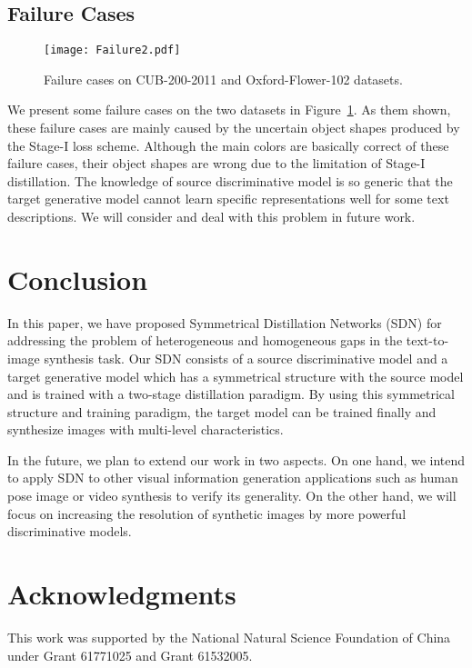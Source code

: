 \documentclass[sigconf]{acmart}
\begin{document}
\subsection{Failure Cases}

\begin{figure}[t]
	\begin{center}
		\texttt{[image: Failure2.pdf]}
	\end{center}
	\caption{Failure cases on CUB-200-2011 and Oxford-Flower-102 datasets.}
	\label{fig:failure}
\end{figure}

We present some failure cases on the two datasets in Figure~\ref{fig:failure}. As them shown, these failure cases are mainly caused by the uncertain object shapes produced by the Stage-I loss scheme. Although the main colors are basically correct of these failure cases, their object shapes are wrong due to the limitation of Stage-I distillation. The knowledge of source discriminative model is so generic that the target generative model cannot learn specific representations well for some text descriptions. We will consider and deal with this problem in future work.


\section{Conclusion}
In this paper, we have proposed Symmetrical Distillation Networks (SDN) for addressing the problem of heterogeneous and homogeneous gaps in the text-to-image synthesis task. Our SDN consists of a source discriminative model and a target generative model which has a symmetrical structure with the source model and is trained with a two-stage distillation paradigm. By using this symmetrical structure and training paradigm, the target model can be trained finally and synthesize images with multi-level characteristics.

In the future, we plan to extend our work in two aspects. On one hand, we intend to apply SDN to other visual information generation applications such as human pose image or video synthesis to verify its generality. On the other hand, we will focus on increasing the resolution of synthetic images by more powerful discriminative models.

\section*{Acknowledgments}
This work was supported by the National Natural Science Foundation of China under Grant 61771025 and Grant 61532005.


\clearpage

\balance

\end{document}
